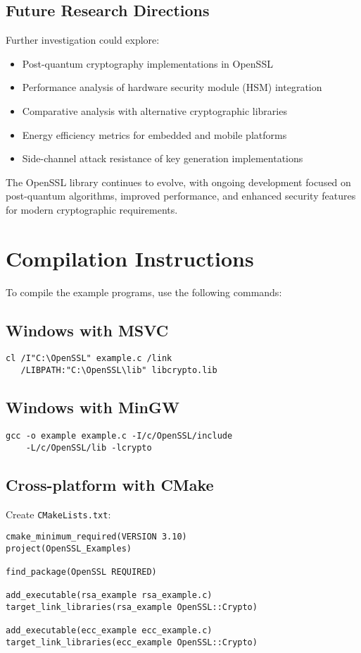 \subsection{Future Research Directions}

Further investigation could explore:
\begin{itemize}
    \item Post-quantum cryptography implementations in OpenSSL
    \item Performance analysis of hardware security module (HSM) integration
    \item Comparative analysis with alternative cryptographic libraries
    \item Energy efficiency metrics for embedded and mobile platforms
    \item Side-channel attack resistance of key generation implementations
\end{itemize}

The OpenSSL library continues to evolve, with ongoing development focused on post-quantum algorithms, improved performance, and enhanced security features for modern cryptographic requirements.

\newpage
{}
\printbibliography

\newpage
\appendix

\section{Compilation Instructions}

To compile the example programs, use the following commands:

\subsection{Windows with MSVC}
\begin{verbatim}
cl /I"C:\OpenSSL" example.c /link 
   /LIBPATH:"C:\OpenSSL\lib" libcrypto.lib
\end{verbatim}

\subsection{Windows with MinGW}
\begin{verbatim}
gcc -o example example.c -I/c/OpenSSL/include 
    -L/c/OpenSSL/lib -lcrypto
\end{verbatim}

\subsection{Cross-platform with CMake}
Create \texttt{CMakeLists.txt}:
\begin{verbatim}
cmake_minimum_required(VERSION 3.10)
project(OpenSSL_Examples)

find_package(OpenSSL REQUIRED)

add_executable(rsa_example rsa_example.c)
target_link_libraries(rsa_example OpenSSL::Crypto)

add_executable(ecc_example ecc_example.c)
target_link_libraries(ecc_example OpenSSL::Crypto)
\end{verbatim}

